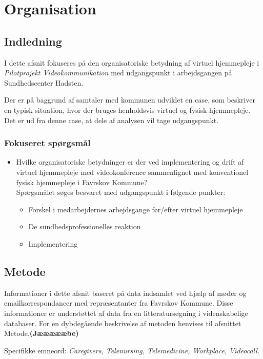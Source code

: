 \chapter{Organisation}

\section{Indledning}
I dette afsnit fokuseres på den organisatoriske betydning af virtuel hjemmepleje i \textit{Pilotprojekt Videokommunikation} med udgangspunkt i arbejdsgangen på Sundhedscenter Hadsten. 

Der er på baggrund af samtaler med kommunen udviklet en case, som beskriver en typisk situation, hvor der bruges henholdsvis virtuel og fysisk hjemmepleje. Det er ud fra denne case, at dele af analysen vil tage udgangspunkt.

\subsection{Fokuseret spørgsmål}

\begin{itemize}
	\item Hvilke organisatoriske betydninger er der ved implementering og drift af virtuel hjemmepleje med videokonference sammenlignet med konventionel fysisk hjemmepleje i Favrskov Kommune? \\Spørgsmålet søges besvaret med udgangspunkt i følgende punkter:
	\begin{itemize}
	\item Forskel i medarbejdernes arbejdsgange før/efter virtuel hjemmepleje
	\item De sundhedsprofessionelles reaktion
	\item Implementering
\end{itemize}
\end{itemize}


\section{Metode}
Informationer i dette afsnit baseret på data indsamlet ved hjælp af møder og emailkorrespondancer med repræsentanter fra Favrskov Kommune. Disse informationer er understøttet af data fra en litteratursøgning i videnskabelige databaser. For en dybdegående beskrivelse af metoden henvises til afsnittet Metode.\textbf{(Jæææææbe)} 

Specifikke emneord: \textit{Caregivers, Telenursing, Telemedicine, Workplace, Videocall.}

